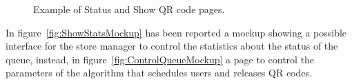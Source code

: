 \begin{figure}[H]
	\centering     %
	\caption{Example of Status and Show QR code pages.}
\end{figure}

In figure~\ref{fig:ShowStatsMockup} has been reported a mockup showing a possible interface for the store manager to control the statistics about the status of the queue, instead,
in figure~\ref{fig:ControlQueueMockup} a page to control the parameters of the algorithm that schedules users and releases QR codes.


